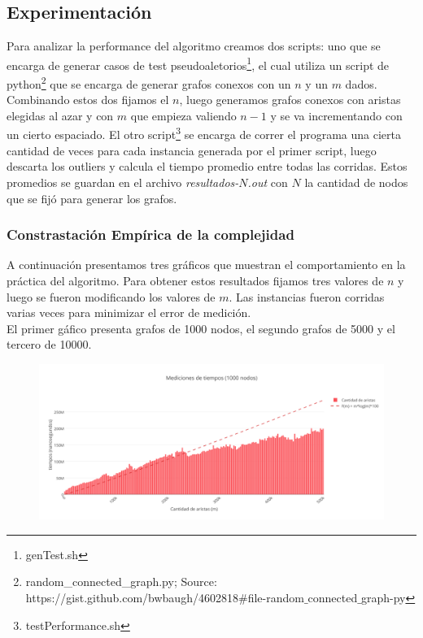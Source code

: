 \subsection{Experimentación}

Para analizar la performance del algoritmo creamos dos scripts: uno que se encarga de generar casos de test pseudoaletorios\footnote{genTest.sh}, el cual utiliza un script de python\footnote{random_connected_graph.py; Source: https://gist.github.com/bwbaugh/4602818$\#$file-random$\_$connected$\_$graph-py} que se encarga de generar grafos conexos con un $n$ y un $m$ dados. Combinando estos dos fijamos el $n$, luego generamos grafos conexos con aristas elegidas al azar y con $m$ que empieza valiendo $n-1$ y se va incrementando con un cierto espaciado. El otro script\footnote{testPerformance.sh} se encarga de correr el programa una cierta cantidad de veces para cada instancia generada por el primer script, luego descarta los outliers y calcula el tiempo promedio entre todas las corridas. Estos promedios se guardan en el archivo \emph{resultados-$N$.out} con $N$ la cantidad de nodos que se fijó para generar los grafos.

\newpage

\subsubsection{Constrastación Empírica de la complejidad}

A continuación presentamos tres gráficos que muestran el comportamiento en la práctica del algoritmo. Para obtener estos resultados fijamos tres valores de $n$ y luego se fueron modificando los valores de $m$. Las instancias fueron corridas varias veces para minimizar el error de medición.\\

El primer gáfico presenta grafos de 1000 nodos, el segundo grafos de 5000 y el tercero de 10000.

\begin{figure}[h!]
	\centering
 	\includegraphics[scale=0.7]{imagenes/ej3/tiempos1000B.png}
 \end{figure}


